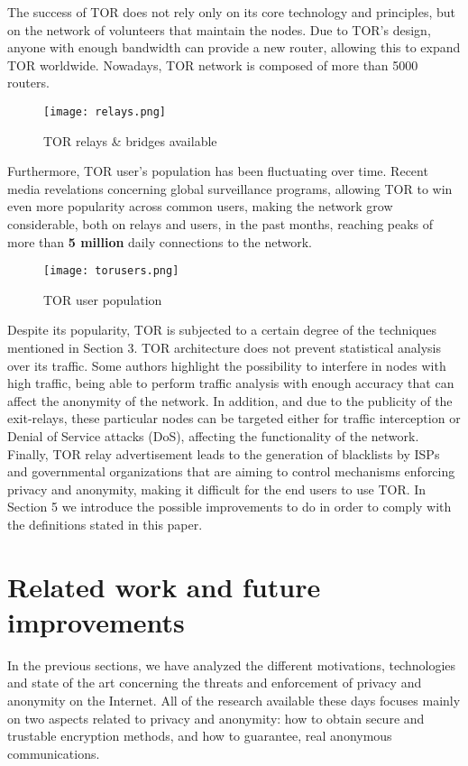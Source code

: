 \documentclass[conference]{IEEEtran}
\begin{document}
The success of TOR does not rely only on its core technology and principles, but on the network of volunteers that maintain the nodes. Due to TOR's design, anyone with enough bandwidth can provide a new router, allowing this to expand TOR worldwide. Nowadays, TOR network is composed of more than 5000 routers.

\begin{figure}[h]
  \centering
  \captionsetup{justification=centering}
  \texttt{[image: relays.png]}
  \caption{TOR relays \& bridges available}
\end{figure}

Furthermore, TOR user's population has been fluctuating over time. Recent media revelations concerning global surveillance programs, allowing TOR to win even more popularity across common users, making the network grow considerable, both on relays and users, in the past months, reaching peaks of more than \textbf{5 million} daily connections to the network.

\begin{figure}[h]
  \centering
  \captionsetup{justification=centering}
  \texttt{[image: torusers.png]}
  \caption{TOR user population}
\end{figure}

Despite its popularity, TOR is subjected to a certain degree of the techniques mentioned in Section 3. TOR architecture does not prevent statistical analysis over its traffic. Some authors highlight the possibility to interfere in nodes with high traffic, being able to perform traffic analysis with enough accuracy that can affect the anonymity of the network\cite{torattack}. In addition, and due to the publicity of the exit-relays, these particular nodes can be targeted either for traffic interception or Denial of Service  attacks (DoS), affecting the functionality of the network. Finally, TOR relay advertisement leads to the generation of blacklists by ISPs and governmental organizations that are aiming to control mechanisms enforcing privacy and anonymity, making it difficult for the end users to use TOR. In Section 5 we introduce the possible improvements to do in order to comply with the definitions stated in this paper.

\section{Related work and future improvements}

In the previous sections, we have analyzed the different motivations, technologies and state of the art concerning the threats and enforcement of privacy and anonymity on the Internet. All of the research available these days focuses mainly on two aspects related to privacy and anonymity: how to obtain secure and trustable encryption methods, and how to guarantee, real anonymous communications.
\end{document}
